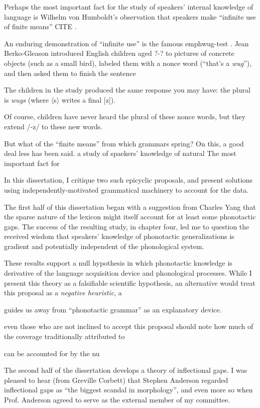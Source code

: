 Perhaps the most important fact for the study of speakers' internal knowledge of language is Wilhelm von Humboldt's observation that speakers make ``infinite use of finite means'' CITE \citep{Chomsky1966}. 

An enduring demonstration of ``infinite use'' is the famous emph{wug-test} \citep{Berko1958}. Jean Berko-Gleason introduced English children aged ?-? to pictures of concrete objects (such as a small bird), labeled them with a nonce word (``that's a \emph{wug}''), and then asked them to finish the sentence

The children in the study produced the same response you may have: the plural is \emph{wugs} (where $\langle$s$\rangle$ writes a final [z]). 

Of course, children have never heard the plural of these nonce words, but they extend /-z/ to these new words. 

But what of the ``finite means'' from which grammars spring? On this, a good deal less has been said.
a study of spaekers' knowledge of natural
The most important fact for 

In this dissertation, I critique two such epicyclic proposals, and present solutions using independently-motivated grammatical machinery to account for the data. 

The first half of this dissertation began with a suggestion from Charles Yang that the sparse nature of the lexicon might itself account for at least some phonotactic gaps. The success of the resulting study, in chapter four, led me to question the received wisdom that speakers' knowledge of phonotactic generalizations is gradient and potentially independent of the phonological system. 

These results support a null hypothesis in which phonotactic knowledge is derivative of the language acquisition device and phonological processes. While I present this theory as a falsifiable scientific hypothesis, an alternative would treat this proposal as a \emph{negative heuristic}, a 

guides us away from ``phonotactic grammar'' as an explanatory device. 

even those who are not inclined to accept this proposal should note how much of the coverage traditionally attributed to

can be accounted for by the nu

The second half of the dissertation develops a theory of inflectional gaps. I was pleased to hear (from Greville Corbett) that Stephen Anderson regarded inflectional gaps as ``the biggest scandal in morphology'', and even more so when Prof. Anderson agreed to serve as the external member of my committee.

